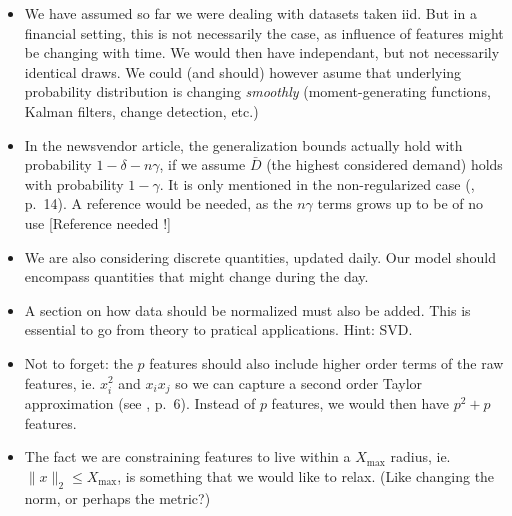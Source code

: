 \begin{itemize}
\item We have assumed so far we were dealing with datasets taken iid. But in a financial
  setting, this is not necessarily the case, as influence of features might be changing
  with time. We would then have independant, but not necessarily identical draws. We could
  (and should) however asume that underlying probability distribution is changing
  \textsl{smoothly} (moment-generating functions, Kalman filters, change detection, etc.)
\item In the newsvendor article, the generalization bounds actually hold with probability
  $1-\delta - n\gamma$, if we assume $\bar D$ (the highest considered demand) holds with
  probability $1-\gamma$. It is only mentioned in the non-regularized case
  (\cite{rudin2015}, p.~14). A reference would be needed, as the $n\gamma$ terms grows up
  to be of no use [Reference needed !]
\item We are also considering discrete quantities, updated daily. Our model should
  encompass quantities that might change during the day.
\item A section on how data should be normalized must also be added. This is essential to
  go from theory to pratical applications. Hint: SVD.
\item Not to forget: the $p$ features should also include higher order terms of the raw
  features, ie. $x_i^2$ and $x_ix_j$ so we can capture a second order Taylor approximation
  (see \cite{rudin2015}, p.~6). Instead of $p$ features, we would then have $p^2+p$
  features. 
\item The fact we are constraining features to live within a $X_{\max}{}$ radius, ie.
  $\|x\|_2\leq X_{\max}$, is something that we would like to relax. (Like changing the norm,
  or perhaps the metric?)
\end{itemize}
